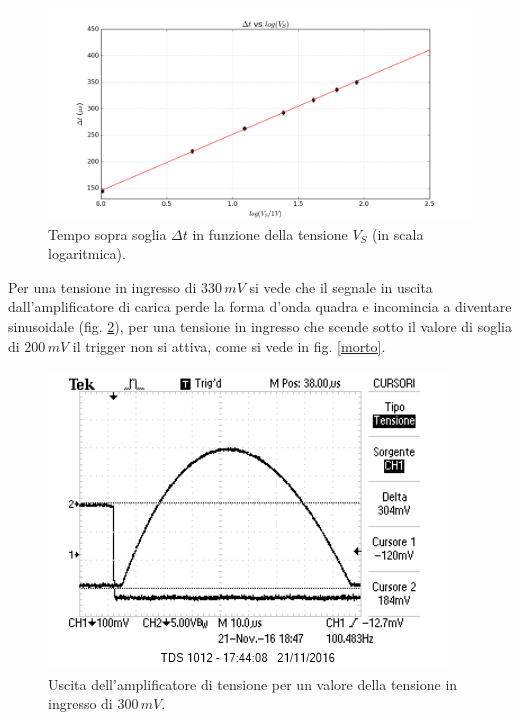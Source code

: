 \documentclass[10pt,a4paper]{article}
\begin{document}
\begin{figure}[htb!]
\centering
\includegraphics[scale=.5]{plot.png}
\caption{Tempo sopra soglia $\Delta t$ in funzione della tensione $V_S$ (in scala logaritmica).}
\label{retta}
\end{figure}

Per una tensione in ingresso di $330 \, mV$ si vede che il segnale in uscita dall'amplificatore di carica perde la forma d'onda quadra e incomincia a diventare sinusoidale (fig. \ref{inizamorire}), per una tensione in ingresso che scende sotto il valore di soglia di $200 \, mV$ il trigger non si attiva, come si vede in fig. \ref{morto}.\\

\begin{figure}[htb!]
\centering
\includegraphics[scale=1.0]{immagini/iniziaamorire.png}
\caption{Uscita dell'amplificatore di tensione per un valore della tensione in ingresso di $300 \, mV$.}
\label{inizamorire}
\end{figure}
\end{document}
